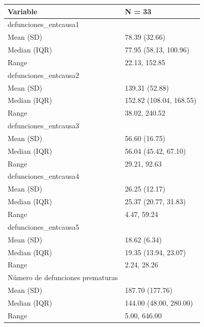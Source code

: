 \begin{table}
\centering\begingroup\fontsize{7}{9}\selectfont

\begin{tabular}{ll}
\toprule
Variable & N = 33\\
\midrule
defunciones\_entcausa1 & \\
\hspace{1em}Mean (SD) & 78.39 (32.66)\\
\hspace{1em}Median (IQR) & 77.95 (58.13, 100.96)\\
\hspace{1em}Range & 22.13, 152.85\\
defunciones\_entcausa2 & \\
\addlinespace
\hspace{1em}Mean (SD) & 139.31 (52.88)\\
\hspace{1em}Median (IQR) & 152.82 (108.04, 168.55)\\
\hspace{1em}Range & 38.02, 240.52\\
defunciones\_entcausa3 & \\
\hspace{1em}Mean (SD) & 56.60 (16.75)\\
\addlinespace
\hspace{1em}Median (IQR) & 56.04 (45.42, 67.10)\\
\hspace{1em}Range & 29.21, 92.63\\
defunciones\_entcausa4 & \\
\hspace{1em}Mean (SD) & 26.25 (12.17)\\
\hspace{1em}Median (IQR) & 25.37 (20.77, 31.83)\\
\addlinespace
\hspace{1em}Range & 4.47, 59.24\\
defunciones\_entcausa5 & \\
\hspace{1em}Mean (SD) & 18.62 (6.34)\\
\hspace{1em}Median (IQR) & 19.35 (13.94, 23.07)\\
\hspace{1em}Range & 2.24, 28.26\\
\addlinespace
Número de defunciones prematuras & \\
\hspace{1em}Mean (SD) & 187.70 (177.76)\\
\hspace{1em}Median (IQR) & 144.00 (48.00, 280.00)\\
\hspace{1em}Range & 5.00, 646.00\\
\bottomrule
\end{tabular}
\endgroup{}
\end{table}

